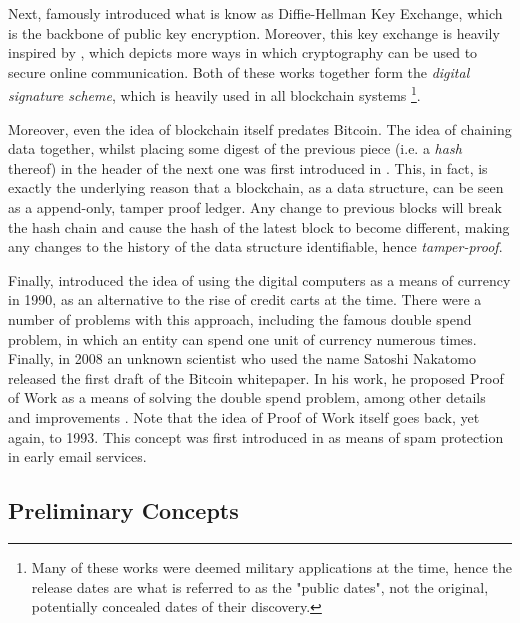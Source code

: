 Next, \cite{Diffie_Hellman_1976} famously introduced what is know as Diffie-Hellman Key Exchange,
which is the backbone of public key encryption. Moreover, this key exchange is heavily inspired by
\cite{Merkle_1978}, which depicts more ways in which cryptography can be used to secure online
communication. Both of these works together form the \textit{digital signature scheme}, which is
heavily used in all blockchain systems \footnote{Many of these works were deemed military
applications at the time, hence the release dates are what is referred to as the "public dates", not
the original, potentially concealed dates of their discovery.}.

Moreover, even the idea of blockchain itself predates Bitcoin. The idea of chaining data together,
whilst placing some digest of the previous piece (i.e. a \textit{hash} thereof) in the header of
the next one was first introduced in \cite{Timestamping_1991}. This, in fact, is exactly the
underlying reason that a blockchain, as a data structure, can be seen as a append-only, tamper proof
ledger. Any change to previous blocks will break the hash chain and cause the hash of the latest
block to become different, making any changes to the history of the data structure identifiable,
hence \textit{tamper-proof}.

Finally, \cite{Chaum_Fiat_Naor_1990} introduced the idea of using the digital computers as a means
of currency in 1990, as an alternative to the rise of credit carts at the time. There were a number
of problems with this approach, including the famous double spend problem, in which an entity can
spend one unit of currency numerous times. Finally, in 2008 an unknown scientist who used the name
Satoshi Nakatomo released the first draft of the Bitcoin whitepaper. In his work, he proposed Proof
of Work as a means of solving the double spend problem, among other details and improvements
\cite{Nakamoto}. Note that the idea of Proof of Work itself goes back, yet again, to 1993. This
concept was first introduced in \cite{pow_Dwork_Naor_1993} as means of spam protection in early
email services.


\subsection{Preliminary Concepts} \label{chap_bg:sec:preliminary}

